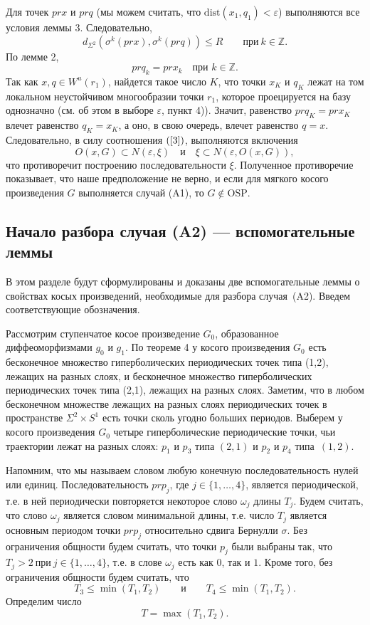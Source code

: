 \documentclass[12pt]{article}
\begin{document}
Для точек $pr x$ и $pr q$ (мы можем считать, что $\textrm{dist}(x_1,q_1)<\varepsilon$) выполняются все условия леммы 3. Следовательно,
$$d_{\Sigma^2}(\sigma^k(pr x),\sigma^k(pr q))\leq R\qquad\textrm{при}\ k\in\mathbb{Z}.$$
По лемме 2, 
$$pr q_k=pr x_k\quad\textrm{при }k\in\mathbb{Z}.$$
Так как $x, q\in W^u(r_1)$, найдется такое число $K$, что точки $x_K$ и $q_K$
лежат на том локальном неустойчивом многообразии точки $r_1$, которое проецируется на базу однозначно (см. об этом в выборе $\varepsilon$, пункт 4)). 
Значит, равенство $pr q_K=pr x_K$  влечет равенство $q_K=x_K$, а оно, в свою очередь, влечет равенство $q=x$. Следовательно,
в силу соотношения $(\ref{3})$, выполняются включения
$$O(x,G)\subset N(\varepsilon,\xi)\quad\textrm{и}\quad \xi\subset N(\varepsilon,O(x,G)),$$
что противоречит построению последовательности $\xi$. 
Полученное противоречие показывает, что наше предположение не верно, и если для мягкого косого произведения $G$ выполняется случай (A1), то $G\notin\textrm{OSP}$.

\subsection{Начало разбора случая (A2) --- вспомогательные леммы}

В этом разделе будут сформулированы и доказаны две вспомогательные леммы о свойствах косых произведений, необходимые для разбора случая~(A2). 
Введем соответствующие обозначения.

Рассмотрим ступенчатое косое произведение $G_0$, образованное диффеоморфизмами $g_0$ и $g_1$. По теореме 4 у косого произведения $G_0$ есть бесконечное множество гиперболических периодических точек типа (1,2), лежащих на разных слоях, и бесконечное множество гиперболических периодических точек типа (2,1), лежащих на разных слоях. Заметим, что в любом бесконечном множестве лежащих на разных слоях периодических точек в пространстве $\Sigma^2\times S^1$ есть точки сколь угодно больших периодов. Выберем у косого произведения $G_0$ четыре гиперболические периодические точки, чьи траектории лежат на разных слоях: $p_1$ и $p_3$ типа $(2,1)$ и $p_2$ и $p_4$ типа~$(1,2)$. 

Напомним, что мы называем словом любую конечную последовательность нулей или единиц.
Последовательность $pr p_j$, где $j\in\{1,\ldots,4\}$, является периодической, т.е. в ней периодически повторяется некоторое слово $\omega_j$ длины $T_j$. Будем считать, что слово $\omega_j$ является словом минимальной длины, т.е. число $T_j$ является основным периодом точки $pr p_j$ относительно сдвига Бернулли $\sigma$. Без ограничения общности будем считать, что точки $p_j$ были выбраны так, что $T_j>2\ \textrm{при}\ j\in\{1,\ldots,4\}$, т.е. в слове $\omega_j$ есть как $0$, так и $1$. Кроме того, без ограничения общности будем считать, что
\begin{equation}
\label{2.5.1}
T_3\leq\min(T_1,T_2)\qquad\textrm{и}\qquad T_4\leq\min(T_1,T_2).
\end{equation}
Определим число
\begin{equation}
\label{2.5.2}
T=\max(T_1,T_2).
\end{equation}
\end{document}
